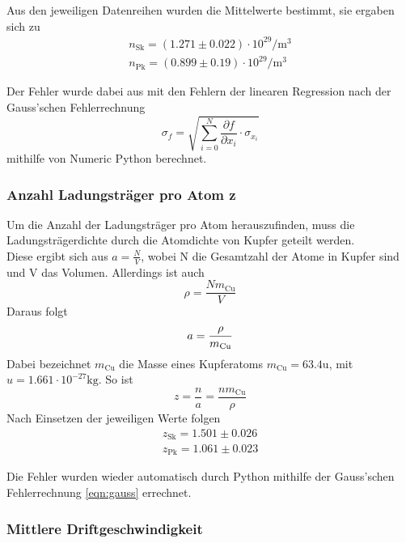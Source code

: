 \noindent Aus den jeweiligen Datenreihen wurden die Mittelwerte bestimmt, sie ergaben sich zu
\begin{align*}
n_\text{Sk} = \left( 1.271 \pm 0.022 \right) \cdot 10^{29} \si{\per\m\cubed}\\
n_\text{Pk} = \left( 0.899\pm 0.19 \right) \cdot 10^{29} \si{\per\m\cubed}
\end{align*}

Der Fehler wurde dabei aus mit den Fehlern der linearen Regression nach der Gauss'schen Fehlerrechnung
\begin{equation}
\sigma_f = \sqrt{\sum_{i=0}^{N} {\frac{\partial f}{\partial x_i} \cdot \sigma_{x_i}}}
\label{eqn:gauss}
\end{equation}
mithilfe von Numeric Python berechnet.

\subsubsection{Anzahl Ladungsträger pro Atom z}

Um die Anzahl der Ladungsträger pro Atom herauszufinden, muss die Ladungsträgerdichte durch 
die Atomdichte von Kupfer geteilt werden.\\
Diese ergibt sich aus $a = \frac{N}{V}$, wobei N die Gesamtzahl der Atome in Kupfer sind und V das Volumen. 
Allerdings ist auch 
\begin{equation*}
\rho = \frac{N m_\text{Cu}}{V}
\end{equation*}
Daraus folgt
\begin{equation*}
a = \frac{\rho}{m_\text{Cu}} \\
\end{equation*}
Dabei bezeichnet $m_\text{Cu}$ die Masse eines Kupferatoms $m_\text{Cu} = 63.4 \si{\atomicmassunit}$, mit $u = 1.661 \cdot 10^{-27}\si{\kilo\g}$.
So ist
\begin{equation}
z = \frac{n}{a} = \frac{n m_\text{Cu}}{\rho}
\end{equation}
Nach Einsetzen der jeweiligen Werte folgen
\begin{align*}
z_\text{Sk} = 1.501 \pm 0.026\\
z_\text{Pk} = 1.061 \pm 0.023
\end{align*}

Die Fehler wurden wieder automatisch durch Python mithilfe der Gauss'schen Fehlerrechnung 
\eqref{eqn:gauss} errechnet.

\subsubsection{Mittlere Driftgeschwindigkeit}

